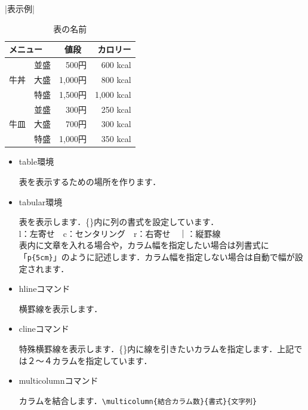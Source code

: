 |表示例|
    \begin{table}[!h]
    \begin{center}
    \caption{表の名前}
    \label{fig:表の名前}
    \begin{tabular}{|l|c|r||r|}
    \hline
            \multicolumn{2}{|Y|}{メニュー} & \multicolumn{1}{c||}{値段} & \multicolumn{1}{p{8\zw}|}{カロリー}\\ \hline \hline
             & 並盛 & 500円 & 600 kcal \\ \cline{2-4}
            牛丼 & 大盛 & 1,000円 & 800 kcal \\ \cline{2-4}
             & 特盛 & 1,500円 & 1,000 kcal \\ \hline
             & 並盛 & 300円 & 250 kcal \\ \cline{2-4}
            牛皿 & 大盛 & 700円 & 300 kcal \\ \cline{2-4}
             & 特盛 & 1,000円 & 350 kcal \\ \hline
    \end{tabular}
    \end{center}
    \end{table}
    \begin{itemize}
    \item table環境

    表を表示するための場所を作ります．
       \item tabular環境

       表を表示します．\{\}内に列の書式を設定しています．\\
    l：左寄せ　c：センタリング　r：右寄せ　｜：縦罫線\\
    表内に文章を入れる場合や，カラム幅を指定したい場合は列書式に「\verb|p{5cm}|」のように記述します．カラム幅を指定しない場合は自動で幅が設定されます．
    \item hlineコマンド

    横罫線を表示します．
    \item clineコマンド

    特殊横罫線を表示します．\{\}内に線を引きたいカラムを指定します．上記では２～４カラムを指定しています．
    \item multicolumnコマンド

    カラムを結合します．\verb|\multicolumn{結合カラム数}{書式}{文字列}|
    \end{itemize}

